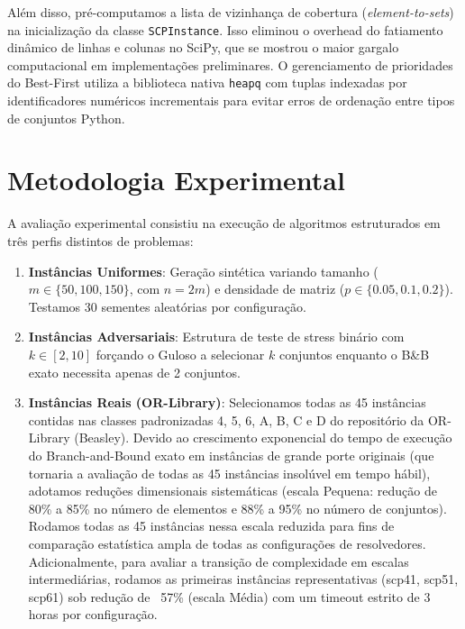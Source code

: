 \documentclass[conference]{IEEEtran}
\begin{document}
Além disso, pré-computamos a lista de vizinhança de cobertura (\textit{element-to-sets}) na inicialização da classe \texttt{SCPInstance}. Isso eliminou o overhead do fatiamento dinâmico de linhas e colunas no SciPy, que se mostrou o maior gargalo computacional em implementações preliminares. O gerenciamento de prioridades do Best-First utiliza a biblioteca nativa \texttt{heapq} com tuplas indexadas por identificadores numéricos incrementais para evitar erros de ordenação entre tipos de conjuntos Python.

\section{Metodologia Experimental}
A avaliação experimental consistiu na execução de algoritmos estruturados em três perfis distintos de problemas:
\begin{enumerate}
\item \textbf{Instâncias Uniformes}: Geração sintética variando tamanho ($m \in \{50, 100, 150\}$, com $n = 2m$) e densidade de matriz ($p \in \{0.05, 0.1, 0.2\}$). Testamos 30 sementes aleatórias por configuração.
\item \textbf{Instâncias Adversariais}: Estrutura de teste de stress binário com $k \in [2, 10]$ forçando o Guloso a selecionar $k$ conjuntos enquanto o B\&B exato necessita apenas de 2 conjuntos.
\item \textbf{Instâncias Reais (OR-Library)}: Selecionamos todas as 45 instâncias contidas nas classes padronizadas 4, 5, 6, A, B, C e D do repositório da OR-Library (Beasley). Devido ao crescimento exponencial do tempo de execução do Branch-and-Bound exato em instâncias de grande porte originais (que tornaria a avaliação de todas as 45 instâncias insolúvel em tempo hábil), adotamos reduções dimensionais sistemáticas (escala Pequena: redução de 80\% a 85\% no número de elementos e 88\% a 95\% no número de conjuntos). Rodamos todas as 45 instâncias nessa escala reduzida para fins de comparação estatística ampla de todas as configurações de resolvedores. Adicionalmente, para avaliar a transição de complexidade em escalas intermediárias, rodamos as primeiras instâncias representativas (scp41, scp51, scp61) sob redução de ~57\% (escala Média) com um timeout estrito de 3 horas por configuração.
\end{enumerate}
\end{document}
